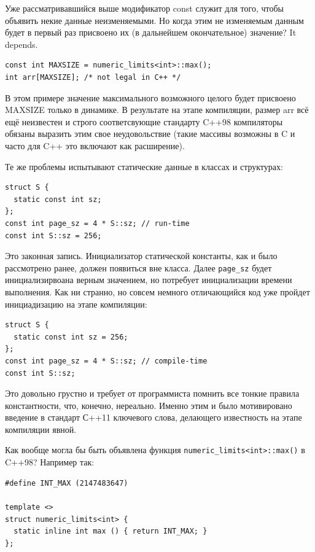 \documentclass[a4paper,12pt,oneside]{book}
\begin{document}
Уже рассматривавшийся выше модификатор const служит для того, чтобы объявить некие данные неизменяемыми. Но когда этим не изменяемым данным будет в первый раз присвоено их (в дальнейшем окончательное) значение? It depends.

\begin{lstlisting}
const int MAXSIZE = numeric_limits<int>::max();
int arr[MAXSIZE]; /* not legal in C++ */
\end{lstlisting}

В этом примере значение максимального возможного целого будет присвоено MAXSIZE только в динамике. В результате на этапе компиляции, размер arr всё ещё неизвестен и строго соответсвующие стандарту C++98 компиляторы обязаны выразить этим свое неудовольствие (такие массивы возможны в C и часто для C++ это включают как расширение).

Те же проблемы испытывают статические данные в классах и структурах:

\begin{lstlisting}
struct S {
  static const int sz;
};
const int page_sz = 4 * S::sz; // run-time
const int S::sz = 256; 
\end{lstlisting}

Это законная запись. Инициализатор статической константы, как и было рассмотрено ранее, должен появиться вне класса. Далее \lstinline!page_sz! будет инициализирвоана верным значением, но потребует инициализации времени выполнения. Как ни странно, но совсем немного отличающийся код уже пройдет инициадизацию на этапе компиляции:

\begin{lstlisting}
struct S {
  static const int sz = 256;
};
const int page_sz = 4 * S::sz; // compile-time
const int S::sz;
\end{lstlisting}

Это довольно грустно и требует от программиста помнить все тонкие правила константности, что, конечно, нереально. Именно этим и было мотивировано введение в стандарт С++11 ключевого слова, делающего известность на этапе компиляции явной.

Как вообще могла бы быть объявлена функция \lstinline!numeric_limits<int>::max()! в C++98? Например так:

\begin{lstlisting}
#define INT_MAX (2147483647)

template <>
struct numeric_limits<int> {
  static inline int max () { return INT_MAX; }
};
\end{lstlisting}
\end{document}
